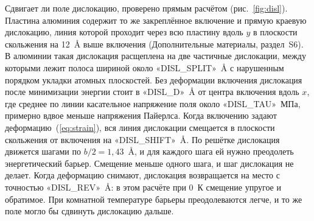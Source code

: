 Сдвигает ли поле дислокацию, проверено прямым расчётом (рис.~\ref{fig:disl}).
Пластина алюминия содержит то же закреплённое включение и прямую краевую
дислокацию, линия которой проходит через всю пластину вдоль $y$
в плоскости скольжения на 12~\AA{} выше включения (Дополнительные
материалы, раздел~S6). В алюминии такая дислокация расщеплена на две
частичные дислокации, между которыми лежит полоса шириной около
«DISL_SPLIT»~\AA{} с нарушенным порядком укладки атомных плоскостей. Без
деформации включения дислокация после минимизации энергии стоит
в «DISL_D»~\AA{} от центра включения вдоль $x$, где среднее по линии
касательное напряжение поля около «DISL_TAU»~МПа, примерно вдвое меньше
напряжения Пайерлса. Когда включению задают деформацию~(\ref{eq:strain}),
вся линия дислокации смещается в плоскости скольжения от включения на
«DISL_SHIFT»~\AA. По решётке дислокация движется шагами по
$b/2=1{,}43$~\AA, и для каждого шага ей нужно преодолеть энергетический
барьер. Смещение меньше одного шага, и шаг дислокация не делает. Когда
деформацию снимают, дислокация возвращается на место с точностью
«DISL_REV»~\AA: в этом расчёте при 0~К смещение упругое и обратимое. При
комнатной температуре барьеры преодолеваются легче, и то же поле могло
бы сдвинуть дислокацию дальше.
